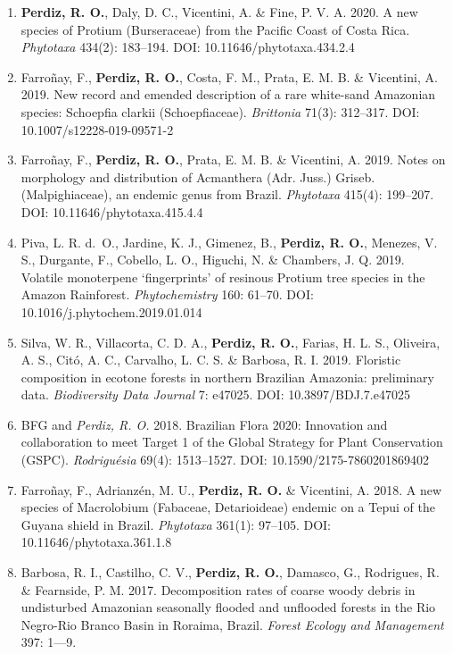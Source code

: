 \documentclass[11pt, a4paper]{awesome-cv}
\begin{document}
\begin{enumerate}
\def\labelenumi{(\arabic{enumi})}
\item
  \textbf{Perdiz, R. O.}, Daly, D. C., Vicentini, A. \& Fine, P. V. A. 2020. A new species of Protium (Burseraceae) from the Pacific Coast of Costa Rica. \emph{Phytotaxa} 434(2): 183--194.
  DOI: 10.11646/phytotaxa.434.2.4
\item
  Farroñay, F., \textbf{Perdiz, R. O.}, Costa, F. M., Prata, E. M. B. \& Vicentini, A. 2019. New record and emended description of a rare white-sand Amazonian species: Schoepfia clarkii (Schoepfiaceae). \emph{Brittonia} 71(3): 312--317.
  DOI: 10.1007/s12228-019-09571-2
\item
  Farroñay, F., \textbf{Perdiz, R. O.}, Prata, E. M. B. \& Vicentini, A. 2019. Notes on morphology and distribution of Acmanthera (Adr. Juss.) Griseb. (Malpighiaceae), an endemic genus from Brazil. \emph{Phytotaxa} 415(4): 199--207.
  DOI: 10.11646/phytotaxa.415.4.4
\item
  Piva, L. R. d.~O., Jardine, K. J., Gimenez, B., \textbf{Perdiz, R. O.}, Menezes, V. S., Durgante, F., Cobello, L. O., Higuchi, N. \& Chambers, J. Q. 2019. Volatile monoterpene `fingerprints' of resinous Protium tree species in the Amazon Rainforest. \emph{Phytochemistry} 160: 61--70.
  DOI: 10.1016/j.phytochem.2019.01.014
\item
  Silva, W. R., Villacorta, C. D. A., \textbf{Perdiz, R. O.}, Farias, H. L. S., Oliveira, A. S., Citó, A. C., Carvalho, L. C. S. \& Barbosa, R. I. 2019. Floristic composition in ecotone forests in northern Brazilian Amazonia: preliminary data. \emph{Biodiversity Data Journal} 7: e47025.
  DOI: 10.3897/BDJ.7.e47025
\item
  BFG and \emph{Perdiz, R. O.} 2018. Brazilian Flora 2020: Innovation and collaboration to meet Target 1 of the Global Strategy for Plant Conservation (GSPC). \emph{Rodriguésia} 69(4): 1513--1527.
  DOI: 10.1590/2175-7860201869402
\item
  Farroñay, F., Adrianzén, M. U., \textbf{Perdiz, R. O.} \& Vicentini, A. 2018. A new species of Macrolobium (Fabaceae, Detarioideae) endemic on a Tepui of the Guyana shield in Brazil. \emph{Phytotaxa} 361(1): 97--105.
  DOI: 10.11646/phytotaxa.361.1.8
\item
  Barbosa, R. I., Castilho, C. V., \textbf{Perdiz, R. O.}, Damasco, G., Rodrigues, R. \& Fearnside, P. M. 2017. Decomposition rates of coarse woody debris in undisturbed Amazonian seasonally flooded and unflooded forests in the Rio Negro-Rio Branco Basin in Roraima, Brazil. \emph{Forest Ecology and Management} 397: 1---9.

\end{enumerate}
\end{document}
